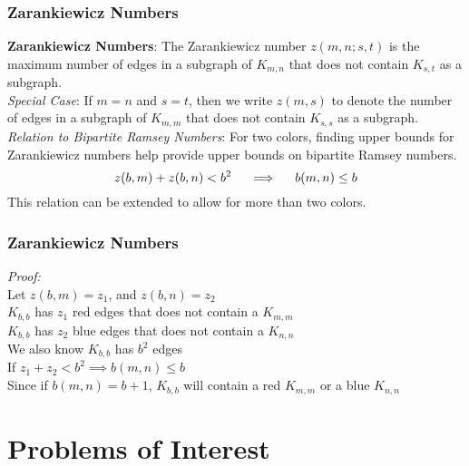 \documentclass[pdf,hyperref={urlbordercolor={0 1 1}},xcolor=pdftex,dvipsnames]{beamer}
\begin{document}
\begin{frame}
  \frametitle{Zarankiewicz Numbers}
  \textbf{Zarankiewicz Numbers}: The Zarankiewicz number $z(m,n;s,t)$ is the maximum 
    number of edges in a subgraph of $K_{m,n}$ that does not contain $K_{s,t}$ as a 
    subgraph. \\\vspace{.25cm}
  \textit{Special Case}: If $m=n$ and $s=t$, then we write $z(m,s)$ to denote the 
    number of edges in a subgraph of $K_{m,m}$ that does not contain $K_{s,s}$ as a 
    subgraph. \\\vspace{.25cm}
  \textit{Relation to Bipartite Ramsey Numbers}: For two colors, finding upper bounds for 
    Zarankiewicz numbers help provide upper bounds on bipartite Ramsey numbers.  
  $$z(b,m) + z(b,n) < b^2  \hspace{4 mm} \implies\hspace{4mm} b(m,n) \le b$$
  This relation can be extended to allow for more than two colors.
\end{frame}

\begin{frame}[noframenumbering]
  \frametitle{Zarankiewicz Numbers}
  \textit{Proof:} \\\vspace{.25cm}
    Let $z(b,m) = z_1$, and  $z(b,n) = z_2$ \\\vspace{.25cm}
    $K_{b,b}$ has $z_1$ red edges that does not contain a $K_{m,m}$ \\\vspace{.25cm}
    $K_{b,b}$ has $z_2$ blue edges that does not contain a $K_{n,n}$ \\\vspace{.25cm}
    We also know $K_{b,b}$ has $b^2$ edges \\\vspace{.25cm}
    If $z_1 + z_2 < b^2 \implies b(m,n) \le b$ \\\vspace{.50cm}
    Since if $b(m,n) = b+1$, $K_{b,b}$ will contain a red $K_{m,m}$ or a blue $K_{n,n}$ 
\end{frame}

\section{Problems of Interest}
\end{document}
